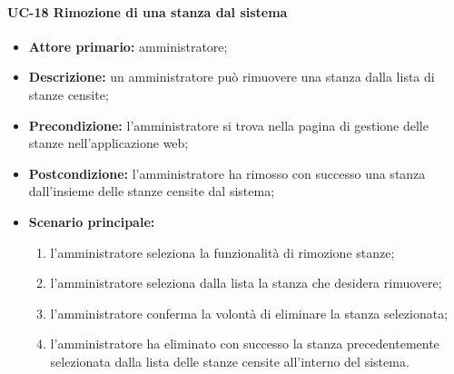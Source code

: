\paragraph{UC-18 Rimozione di una stanza dal sistema}
\begin{itemize}
    \item \textbf{Attore primario:} amministratore;
    \item \textbf{Descrizione:} un amministratore pu\`{o} rimuovere una stanza dalla lista di stanze censite;
    \item \textbf{Precondizione:} l'amministratore si trova nella pagina di gestione delle stanze nell'applicazione web;
    \item \textbf{Postcondizione:} l'amministratore ha rimosso con successo una stanza dall'insieme delle stanze censite dal sistema;
    \item \textbf{Scenario principale:}
    \begin{enumerate}
        \item l'amministratore seleziona la funzionalità di rimozione stanze;
        \item l'amministratore seleziona dalla lista la stanza che desidera rimuovere;
        \item l'amministratore conferma la volontà di eliminare la stanza selezionata;
        \item l'amministratore ha eliminato con successo la stanza precedentemente selezionata dalla lista delle stanze censite all'interno del sistema.
    \end{enumerate}
\end{itemize}

